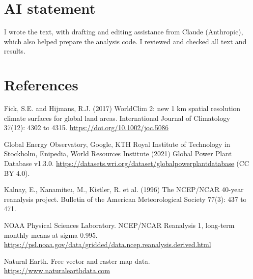 \documentclass[11pt,a4paper]{article}
\begin{document}
\section*{AI statement}
I wrote the text, with drafting and editing assistance from Claude (Anthropic), which also helped prepare the analysis code. I reviewed and checked all text and results.

\section*{References}
\small
\begin{description}\setlength{\itemsep}{2pt}
\item Fick, S.E. and Hijmans, R.J. (2017) WorldClim 2: new 1 km spatial resolution climate surfaces for global land areas. International Journal of Climatology 37(12): 4302 to 4315. \url{https://doi.org/10.1002/joc.5086}
\item Global Energy Observatory, Google, KTH Royal Institute of Technology in Stockholm, Enipedia, World Resources Institute (2021) Global Power Plant Database v1.3.0. \url{https://datasets.wri.org/dataset/globalpowerplantdatabase} (CC BY 4.0).
\item Kalnay, E., Kanamitsu, M., Kistler, R. et al. (1996) The NCEP/NCAR 40-year reanalysis project. Bulletin of the American Meteorological Society 77(3): 437 to 471.
\item NOAA Physical Sciences Laboratory. NCEP/NCAR Reanalysis 1, long-term monthly means at sigma 0.995. \url{https://psl.noaa.gov/data/gridded/data.ncep.reanalysis.derived.html}
\item Natural Earth. Free vector and raster map data. \url{https://www.naturalearthdata.com}
\end{description}
\end{document}
